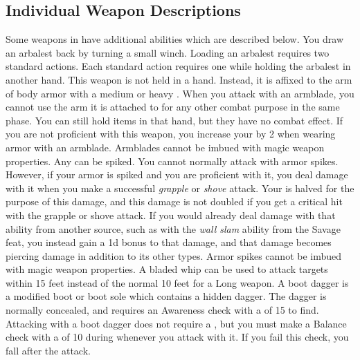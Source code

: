     \subsection{Individual Weapon Descriptions}
        Some weapons in  have additional abilities which are described below.
         You draw an arbalest back by turning a small winch. Loading an arbalest requires two standard actions.
        Each standard action requires one  while holding the arbalest in another hand.
         This weapon is not held in a hand.
        Instead, it is affixed to the arm of body armor with a medium or heavy .
        When you attack with an armblade, you cannot use the arm it is attached to for any other combat purpose in the same phase.
        You can still hold items in that hand, but they have no combat effect.
        If you are not proficient with this weapon, you increase your  by 2 when wearing armor with an armblade.
        Armblades cannot be imbued with magic weapon properties.
         Any  can be spiked.
        You cannot normally attack with armor spikes.
        However, if your armor is spiked and you are proficient with it, you deal damage with it when you make a successful \textit{grapple} or \textit{shove} attack.
        Your  is halved for the purpose of this damage, and this damage is not doubled if you get a critical hit with the grapple or shove attack.
        If you would already deal damage with that ability from another source, such as with the \textit{wall slam} ability from the Savage feat, you instead gain a \plus1d bonus to that damage, and that damage becomes piercing damage in addition to its other types.
        Armor spikes cannot be imbued with magic weapon properties.
         A bladed whip can be used to attack targets within 15 feet instead of the normal 10 feet for a Long weapon.
         A boot dagger is a modified boot or boot sole which contains a hidden dagger.
        The dagger is normally concealed, and requires an Awareness check with a  of 15 to find.
        Attacking with a boot dagger does not require a , but you must make a Balance check with a  of 10 during whenever you attack with it.
        If you fail this check, you fall \prone after the attack.

